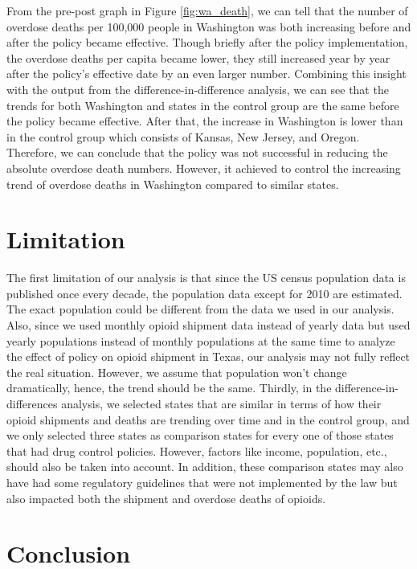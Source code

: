 \documentclass[12pt,letterpaper]{article}
\begin{document}
From the pre-post graph in Figure \ref{fig:wa_death}, we can tell that the number of overdose deaths per 100,000 people in Washington was both increasing before and after the policy became effective. Though briefly after the policy implementation, the overdose deaths per capita became lower, they still increased year by year after the policy's effective date by an even larger number. Combining this insight with the output from the difference-in-difference analysis, we can see that the trends for both Washington and states in the control group are the same before the policy became effective. After that, the increase in Washington is lower than in the control group which consists of Kansas, New Jersey, and Oregon. Therefore, we can conclude that the policy was not successful in reducing the absolute overdose death numbers. However, it achieved to control the increasing trend of overdose deaths in Washington compared to similar states.

\section{Limitation}

The first limitation of our analysis is that since the US census population data is published once every decade, the population data except for 2010 are estimated. The exact population could be different from the data we used in our analysis. Also, since we used monthly opioid shipment data instead of yearly data but used yearly populations instead of monthly populations at the same time to analyze the effect of policy on opioid shipment in Texas, our analysis may not fully reflect the real situation. However, we assume that population won’t change dramatically, hence, the trend should be the same. Thirdly, in the difference-in-differences analysis, we selected states that are similar in terms of how their opioid shipments and deaths are trending over time and in the control group, and we only selected three states as comparison states for every one of those states that had drug control policies. However, factors like income, population, etc., should also be taken into account. In addition, these comparison states may also have had some regulatory guidelines that were not implemented by the law but also impacted both the shipment and overdose deaths of opioids.


\section{Conclusion}
\end{document}
